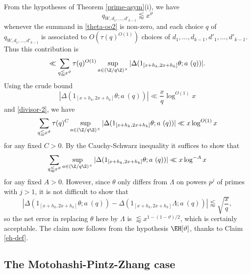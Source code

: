 From the hypotheses of Theorem \ref{prime-asym}(i), we have
$$ q_{W,d_1,\dots,d'_{k-1}} \lessapprox x^\vartheta$$
whenever the summand in \eqref{theta-oo2} is non-zero, and each choice $q$ of $q_{W,d_1,\dots,d'_{k-1}}$ is associated to $O( \tau(q)^{O(1)} )$ choices of $d_1,\dots,d_{k-1},d'_1,\dots,d'_{k-1}$.  Thus this contribution is
$$
\ll \sum_{q \lessapprox x^\vartheta} \tau(q)^{O(1)} \sup_{a \in (\Z/q\Z)^\times} |\Delta( 1_{[x+h_k,2x+h_k]} \theta; a\ (q) )|.$$
Using the crude bound
$$ |\Delta( 1_{[x+h_k,2x+h_k]} \theta; a\ (q) )| \ll \frac{x}{q} \log^{O(1)} x$$
and \eqref{divisor-2}, we have
$$ \sum_{q \lessapprox x^\vartheta} \tau(q)^C \sup_{a \in (\Z/q\Z)^\times} |\Delta( 1_{[x+h_k,2x+h_k]} \theta; a\ (q) )| \ll x \log^{O(1)} x$$
for any fixed $C>0$. By the Cauchy-Schwarz inequality it suffices to show that
$$ \sum_{q \lessapprox x^\vartheta} \sup_{a \in (\Z/q\Z)^\times} |\Delta( 1_{[x+h_k,2x+h_k]} \theta; a\ (q) )| \ll x \log^{-A} x$$
for any fixed $A>0$.  However, since $\theta$ only differs from $\Lambda$ on powers $p^j$ of primes with $j>1$, it is not difficult to show that
$$  |\Delta( 1_{[x+h_k,2x+h_k]} \theta; a\ (q) ) -  \Delta( 1_{[x+h_k,2x+h_k]} \Lambda; a\ (q) )| \lessapprox \sqrt{\frac{x}{q}}, $$
so the net error in replacing $\theta$ here by $\Lambda$ is $\lessapprox x^{1 - (1-\vartheta)/2}$, which is certainly acceptable.  The claim now follows from the hypothesis $\EH[\vartheta]$, thanks to Claim \ref{eh-def}.


\subsection{The Motohashi-Pintz-Zhang case}


